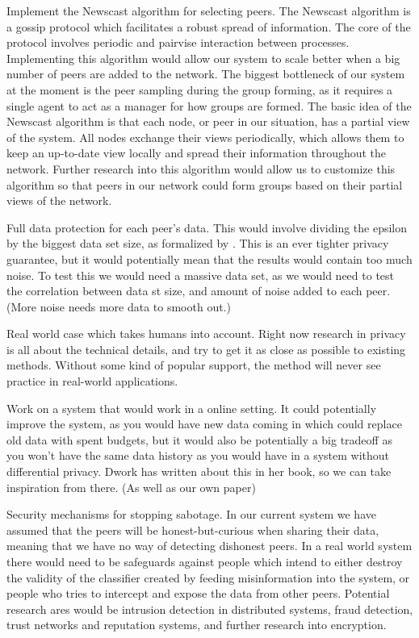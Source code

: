 Implement the Newscast algorithm for selecting peers. The Newscast algorithm is a gossip protocol which facilitates a robust spread of information. The core of the protocol involves periodic and pairvise interaction between processes. Implementing this algorithm would allow our system to scale better when a big number of peers are added to the network. The biggest bottleneck of our system at the moment is the peer sampling during the group forming, as it requires a single agent to act as a manager for how groups are formed. The basic idea of the Newscast algorithm is that each node, or peer in our situation, has a partial view of the system. All nodes exchange their views periodically, which allows them to keep an up-to-date view locally and spread their information throughout the network. Further research into this algorithm would allow us to customize this algorithm so that peers in our network could form groups based on their partial views of the network. 

Full data protection for each peer's data. This would involve dividing the epsilon by the biggest data set size, as formalized by \cite{dwork2013algorithmic}. This is an ever tighter privacy guarantee, but it would potentially mean that the results would contain too much noise. To test this we would need a massive data set, as we would need to test the correlation between data st size, and amount of noise added to each peer. (More noise needs more data to smooth out.)

Real world case which takes humans into account. Right now research in privacy is all about the technical details, and try to get it as close as possible to existing methods. Without some kind of popular support, the method will never see practice in real-world applications. 

Work on a system that would work in a online setting. It could potentially improve the system, as you would have new data coming in which could replace old data with spent budgets, but it would also be potentially a big tradeoff as you won't have the same data history as you would have in a system without differential privacy. Dwork has written about this in her book, so we can take inspiration from there. (As well as our own paper)

Security mechanisms for stopping sabotage. In our current system we have assumed that the peers will be honest-but-curious when sharing their data, meaning that we have no way of detecting dishonest peers. In a real world system there would need to be safeguards against people which intend to either destroy the validity of the classifier created by feeding misinformation into the system, or people who tries to intercept and expose the data from other peers. Potential research ares would be intrusion detection in distributed systems, fraud detection, trust networks and reputation systems, and further research into encryption.  



\newpage
\listoftodos[Notes]

\cleardoublepage